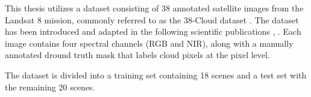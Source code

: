 {This thesis utilizes a dataset consisting of 38 annotated satellite images from the Landsat 8 mission, commonly referred to as the 38-Cloud dataset \cite{38cloud}. The dataset has been introduced and adapted in the following scientific publications \cite{CloudNet2019}, \cite{CloudDet2018}. Each image contains four spectral channels (RGB and NIR), along with a manually annotated dround truth mask that labels cloud pixels at the pixel level.

The dataset is divided into a training set containing 18 scenes and a test set with the remaining 20 scenes.

}